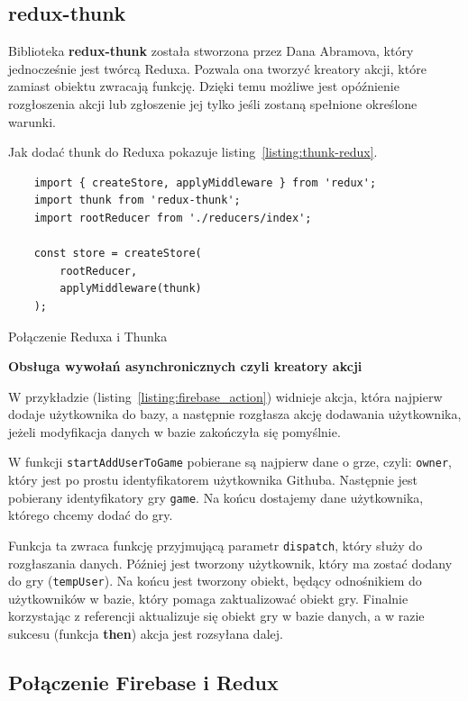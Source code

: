 \subsection{redux-thunk}

Biblioteka \textbf{redux-thunk} została stworzona przez Dana Abramova,
który jednocześnie jest twórcą Reduxa. Pozwala ona tworzyć kreatory akcji,
które zamiast obiektu zwracają funkcję.
Dzięki temu możliwe jest opóźnienie rozgłoszenia akcji lub zgłoszenie jej tylko
jeśli zostaną spełnione określone warunki.~\cite{www_thunk}

Jak dodać thunk do Reduxa pokazuje listing~\ref{listing:thunk-redux}.

\begin{listing}
\begin{verbatim}
    import { createStore, applyMiddleware } from 'redux';
    import thunk from 'redux-thunk';
    import rootReducer from './reducers/index';

    const store = createStore(
        rootReducer,
        applyMiddleware(thunk)
    );
\end{verbatim}
\caption{Połączenie Reduxa i Thunka} \label{listing:thunk-redux}
\end{listing}

\begin{center}
	\textbf{Obsługa wywołań asynchronicznych czyli kreatory akcji}
\end{center}

W przykładzie (listing~\ref{listing:firebase_action}) widnieje akcja,
która najpierw dodaje użytkownika do bazy, a następnie rozgłasza akcję dodawania użytkownika,
jeżeli modyfikacja danych w bazie zakończyła się pomyślnie.

W funkcji \texttt{startAddUserToGame} pobierane są najpierw dane o grze, czyli: \texttt{owner},
który jest po prostu identyfikatorem użytkownika Githuba.
Następnie jest pobierany identyfikatory gry \texttt{game}.
Na końcu dostajemy dane użytkownika, którego chcemy dodać do gry.

Funkcja ta zwraca funkcję przyjmującą parametr \texttt{dispatch},
który służy do rozgłaszania danych.
Później jest tworzony użytkownik, który ma zostać dodany do gry (\texttt{tempUser}).
Na końcu jest tworzony obiekt, będący odnośnikiem do użytkowników w bazie,
który pomaga zaktualizować obiekt gry.
Finalnie korzystając z referencji aktualizuje się obiekt gry w bazie danych,
a w razie sukcesu (funkcja \textbf{then}) akcja jest rozsyłana dalej.

\subsection{Połączenie Firebase i Redux}

